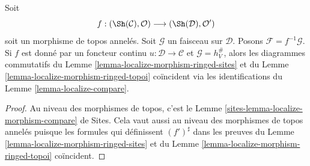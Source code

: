 \begin{lemma}
\label{lemma-localize-morphism-compare}
Soit
$$
f :
(\Sh(\mathcal{C}), \mathcal{O})
\longrightarrow
(\Sh(\mathcal{D}), \mathcal{O}')
$$
soit un morphisme de topos annelés.
Soit $\mathcal{G}$ un faisceau sur $\mathcal{D}$.
Posons $\mathcal{F} = f^{-1}\mathcal{G}$.
Si $f$ est donné par un foncteur continu $u : \mathcal{D} \to \mathcal{C}$
et $\mathcal{G} = h_V^\#$, alors les diagrammes commutatifs du
Lemme \ref{lemma-localize-morphism-ringed-sites}
et du
Lemme \ref{lemma-localize-morphism-ringed-topoi}
coïncident via les identifications du
Lemme \ref{lemma-localize-compare}.
\end{lemma}

\begin{proof}
Au niveau des morphismes de topos, c'est le
Lemme \ref{sites-lemma-localize-morphism-compare} de Sites.
Cela vaut aussi au niveau des morphismes de topos annelés puisque les
formules qui définissent $(f')^\sharp$ dans les preuves du
Lemme \ref{lemma-localize-morphism-ringed-sites}
et du
Lemme \ref{lemma-localize-morphism-ringed-topoi}
coïncident.
\end{proof}

